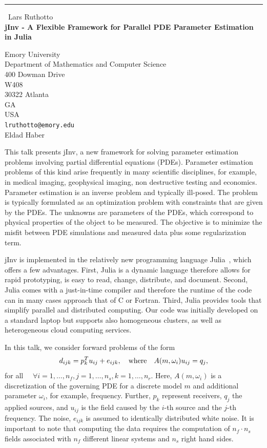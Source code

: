 \documentclass{report}
\begin{document}
\begin{center}
\rule{6in}{1pt} \
{\large Lars Ruthotto \\
{\bf jInv - A Flexible Framework for Parallel PDE Parameter Estimation in Julia}}

Emory University \\ Department of Mathematics and Computer Science \\ 400 Dowman Drive \\ W408 \\ 30322 Atlanta \\ GA \\ USA
\\
{\tt lruthotto@emory.edu}\\
Eldad Haber\end{center}

This talk presents jInv, a new framework for solving parameter estimation
problems involving partial differential equations (PDEs). Parameter
estimation problems of this kind arise frequently in many scientific
disciplines, for example, in medical imaging, geophysical imaging, non
destructive testing and economics. Parameter estimation is an inverse
problem and typically ill-posed. The problem is typically formulated as
an optimization problem with constraints that are given by the PDEs. The
unknowns are parameters of the PDEs, which correspond to physical
properties of the object to be measured. The objective is to minimize the
misfit between PDE simulations and measured data plus some regularization
term.

jInv is implemented in the relatively new programming language
Julia~\cite{BezansonEtAl2012}, which offers a few advantages. First,
Julia is a dynamic language therefore allows for rapid prototyping, is
easy to read, change, distribute, and document. Second, Julia comes with
a just-in-time compiler and therefore the runtime of the code can in many
cases approach that of C or Fortran. Third, Julia provides tools that
simplify parallel and distributed computing. Our code was initially
developed on a standard laptop but supports also homogeneous clusters, as
well as heterogeneous cloud computing services.

In this talk, we consider forward problems of the form
\begin{equation}\label{eq:fwd}
d_{ijk} = p_k^T u_{ij} + e_{ijk},\quad {\rm where}\quad A(m,\omega_i) u_{ij} = q_j,
\end{equation}
for all $\quad \forall i=1,\ldots,n_f, j=1,\ldots,n_s, k=1,\ldots,n_r$.
Here, $A(m,\omega_i)$ is a discretization of the governing PDE for a
discrete model $m$ and additional parameter $\omega_i$, for example,
frequency. Further, $p_k$ represent receivers, $q_j$ the applied sources,
and $u_{ij}$ is the field caused by the $i$-th source and the $j$-th
frequency. The noise, $e_{ijk}$ is assumed to identically distributed
white noise. It is important to note that computing the data requires the
computation of $n_f \cdot n_s$ fields associated with $n_f$ different
linear systems and $n_s$ right hand sides.
\end{document}
